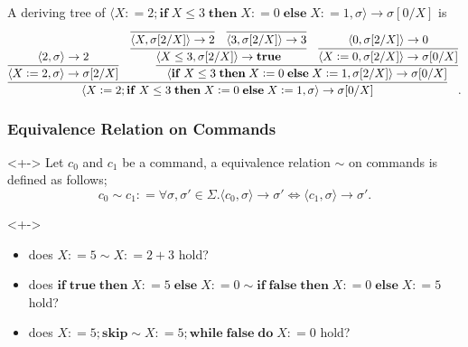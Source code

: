 \documentclass[12pt,aspectratio=169]{beamer}
\def\coloneqq{\mathrel{\mathop:}=}%
\newcommand{\cpair}[1]{\langle #1 \rangle}
\newcommand{\ifthen}[3]{\mathbf{if}\; #1 \; \mathbf{then}\; #2 \; \mathbf{else}\; #3}
\newcommand{\while}[2]{\mathbf{while}\; #1 \; \mathbf{do}\; #2}
\begin{document}
\begin{frame}
    \begin{example}
        A deriving tree of $\cpair{X \coloneqq 2; \ifthen{X \leq 3}{X \coloneqq 0}{X \coloneqq 1}, \sigma} \to \sigma[0/X]$ is
        {\small
        \[
            \infer{\cpair{X \coloneqq 2;\ifthen{X \leq 3}{X \coloneqq 0}{X \coloneqq 1}, \sigma} \to \sigma[0/X]}
                {
                    \infer{\cpair{X \coloneqq 2, \sigma} \to \sigma[2/X]}{\cpair{2,\sigma} \to 2} &
                    \infer{\cpair{\ifthen{X \leq 3}{X \coloneqq 0}{X \coloneqq 1}, \sigma[2/X]} \to \sigma[0/X]}
                        {
                            \infer{\cpair{X \leq 3,\sigma[2/X]} \to \mathbf{true}}
                                {\infer{\cpair{X, \sigma[2/X]} \to 2}{} & \infer{\cpair{3, \sigma[2/X]} \to 3}{}}
                            &
                            \infer{\cpair{X \coloneqq 0, \sigma[2/X]} \to \sigma[0/X]}{\cpair{0,\sigma[2/X]} \to 0}
                        }
                }.
        \]
    }
    \end{example}
\end{frame}


\begin{frame}
    \frametitle{Equivalence Relation on Commands}
    \begin{definition}<+->
        Let $c_0$ and $c_1$ be a command,  
        a equivalence relation $\sim$ on commands is defined as follows;
        \[
            c_0 \sim c_1 \coloneqq \forall \sigma, \sigma' \in \Sigma . \cpair{c_0, \sigma} \to \sigma' \iff \cpair{c_1, \sigma} \to \sigma'.
        \]
    \end{definition}

    \begin{example}[Quiz]<+->
        \begin{itemize}[<+->]
            \item does $X \coloneqq 5 \sim  X \coloneqq 2 + 3$ hold? 
                \pause
            \item does $\ifthen{\mathbf{true}}{X \coloneqq 5}{X \coloneqq 0} \sim \ifthen{\mathbf{false}}{X \coloneqq 0}{X \coloneqq 5}$ hold? 
                \pause
            \item does $X \coloneqq 5 ; \mathbf{skip} \sim X \coloneqq 5 ; \while{\mathbf{false}}{X \coloneqq 0}$ hold? 
        \end{itemize}
    \end{example}

\end{frame}
\end{document}
